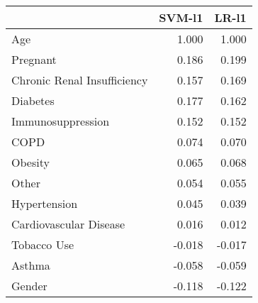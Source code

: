 \begin{tabular}{lrr}
\toprule
{} &  SVM-l1 &  LR-l1 \\
\midrule
Age                         &   1.000 &  1.000 \\
Pregnant                    &   0.186 &  0.199 \\
Chronic Renal Insufficiency &   0.157 &  0.169 \\
Diabetes                    &   0.177 &  0.162 \\
Immunosuppression           &   0.152 &  0.152 \\
COPD                        &   0.074 &  0.070 \\
Obesity                     &   0.065 &  0.068 \\
Other                       &   0.054 &  0.055 \\
Hypertension                &   0.045 &  0.039 \\
Cardiovascular Disease      &   0.016 &  0.012 \\
Tobacco Use                 &  -0.018 & -0.017 \\
Asthma                      &  -0.058 & -0.059 \\
Gender                      &  -0.118 & -0.122 \\
\bottomrule
\end{tabular}
